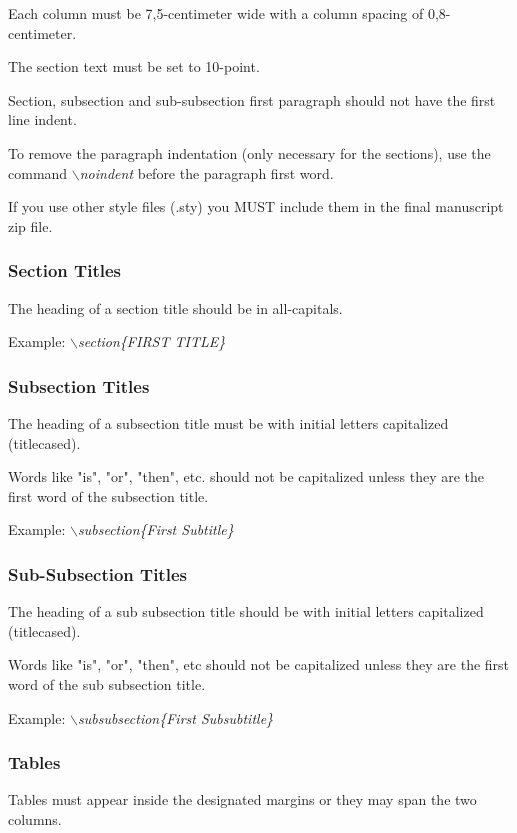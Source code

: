 \documentclass[a4paper,twoside]{article}
\begin{document}
Each column must be 7,5-centimeter wide with a column spacing
of 0,8-centimeter.

The section text must be set to 10-point.

Section, subsection and sub-subsection first paragraph should not
have the first line indent.

To remove the paragraph indentation (only necessary for the
sections), use the command \textit{$\backslash$noindent} before the
paragraph first word.

If you use other style files (.sty) you MUST include them in the
final manuscript zip file.


\subsubsection{Section Titles}

The heading of a section title should be in all-capitals.

Example: \textit{$\backslash$section\{FIRST TITLE\}}

\subsubsection{Subsection Titles}

The heading of a subsection title must be with initial letters
capitalized (titlecased).

Words like "is", "or", "then", etc. should not be capitalized unless
they are the first word of the subsection title.

Example: \textit{$\backslash$subsection\{First Subtitle\}}

\subsubsection{Sub-Subsection Titles}

The heading of a sub subsection title should be with initial letters
capitalized (titlecased).

Words like "is", "or", "then", etc should not be capitalized unless
they are the first word of the sub subsection title.

Example: \textit{$\backslash$subsubsection\{First Subsubtitle\}}

\subsubsection{Tables}

Tables must appear inside the designated margins or they may span
the two columns.
\end{document}
